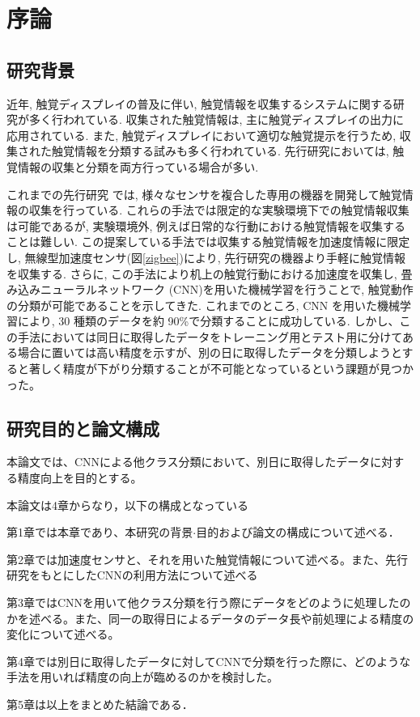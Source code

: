 ﻿

\chapter{序論} \label{sec:intro}
\section{研究背景}
近年, 触覚ディスプレイの普及に伴い, 触覚情報を収集するシステムに関する研究が多く行われている\cite{c3_}. 収集された触覚情報は, 主に触覚ディスプレイの出力に応用されている. 
また, 触覚ディスプレイにおいて適切な触覚提示を行うため, 収集された触覚情報を分類する試みも多く行われている. 先行研究においては, 触覚情報の収集と分類を両方行っている場合が多い. 

これまでの先行研究 \cite{c1} \cite{c2} では, 様々なセンサを複合した専用の機器を開発して触覚情報の収集を行っている. これらの手法では限定的な実験環境下での触覚情報収集は可能であるが, 実験環境外, 例えば日常的な行動における触覚情報を収集することは難しい.  
この提案している手法では収集する触覚情報を加速度情報に限定し, 無線型加速度センサ\cite{c5}(図\ref{zigbee})により, 先行研究の機器より手軽に触覚情報を収集する. 
さらに, この手法により机上の触覚行動における加速度を収集し, 畳み込みニューラルネットワーク (CNN)を用いた機械学習を行うことで, 触覚動作の分類が可能であることを示してきた. これまでのところ, CNN を用いた機械学習により, 30 種類のデータを約 90\%で分類することに成功している. 
しかし、この手法においては同日に取得したデータをトレーニング用とテスト用に分けてある場合に置いては高い精度を示すが、別の日に取得したデータを分類しようとすると著しく精度が下がり分類することが不可能となっているという課題が見つかった。


\section{研究目的と論文構成}
本論文では、CNNによる他クラス分類において、別日に取得したデータに対する精度向上を目的とする。



本論文は4章からなり，以下の構成となっている

第1章では本章であり、本研究の背景$\cdot$目的および論文の構成について述べる．

第2章では加速度センサと、それを用いた触覚情報について述べる。また、先行研究をもとにしたCNNの利用方法について述べる　%

第3章ではCNNを用いて他クラス分類を行う際にデータをどのように処理したのかを述べる。また、同一の取得日によるデータのデータ長や前処理による精度の変化について述べる。

第4章では別日に取得したデータに対してCNNで分類を行った際に、どのような手法を用いれば精度の向上が臨めるのかを検討した。

第5章は以上をまとめた結論である．
